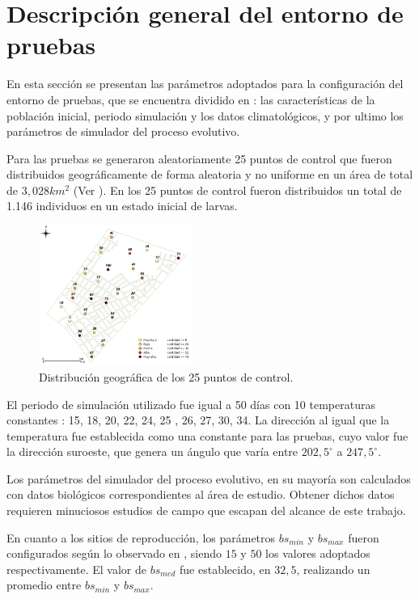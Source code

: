 \section{Descripción general del entorno de pruebas}
En esta sección se presentan las parámetros adoptados para la configuración del entorno de
pruebas, que se encuentra dividido en : las características de la población inicial, periodo
simulación y los datos climatológicos, y por ultimo los parámetros de simulador del proceso
evolutivo.

Para las pruebas se generaron aleatoriamente 25 puntos de control que fueron distribuidos
geográficamente de forma aleatoria y no uniforme en un área de total de $3,028 km^{2}$
(Ver \label{fig:distribucion-puntos}). En los 25 puntos de control fueron distribuidos un total de
1.146 individuos en un estado inicial de larvas.

\begin{figure}[!t]
    \centering
    \includegraphics[width=0.45\textwidth]{../book/capitulo-6/graphics/extension-poblacion.png}
    \caption{\label{fig:distribucion-puntos}Distribución geográfica de los 25 puntos de control.}
\end{figure}

El periodo de simulación utilizado fue igual a 50 días con 10 temperaturas constantes :
15\textcelsius , 18\textcelsius , 20\textcelsius , 22\textcelsius , 24\textcelsius , 25\textcelsius
, 26\textcelsius , 27\textcelsius , 30\textcelsius , 34\textcelsius. La dirección al igual que la
temperatura fue establecida como una constante para las pruebas, cuyo valor fue la dirección
suroeste, que genera un ángulo que varía entre $202,5^{\circ}$ a $247,5^{\circ}$.

Los parámetros del simulador del proceso evolutivo, en su mayoría son calculados con datos
biológicos correspondientes al área de estudio. Obtener dichos datos requieren minuciosos estudios
de campo que escapan del alcance de este trabajo.

En cuanto a los sitios de reproducción, los parámetros $bs_{min}$ y $bs_{max}$ fueron
configurados según lo observado en \cite{otero2006stochastic, otero2008stochastic}, siendo $15$ y
$50$ los valores adoptados respectivamente.  El valor de $bs_{med}$ fue establecido, en $32,5$,
realizando un promedio entre $bs_{min}$ y $bs_{max}$.

